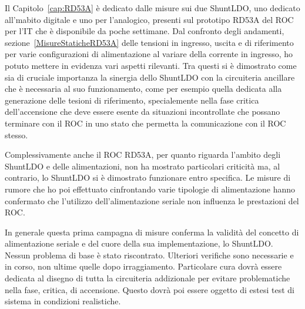 Il Capitolo~\ref{cap:RD53A} \`e dedicato dalle misure sui due ShuntLDO, uno dedicato all'mabito digitale e uno per l'analogico, presenti sul prototipo RD53A del ROC per l'IT che \`e disponibile da poche settimane.
Dal confronto degli andamenti, sezione~\ref{MisureStaticheRD53A} delle tensioni in ingresso, uscita e di riferimento per varie configurazioni di alimentazione 
al variare della corrente in ingresso, ho potuto mettere in evidenza vari aspetti rilevanti. Tra questi si \`e dimostrato come sia di cruciale importanza la sinergia dello ShuntLDO con la circuiteria ancillare che \`e necessaria al suo funzionamento, come per esempio quella dedicata alla generazione delle tesioni di riferimento, specialemente nella fase critica dell'accensione che deve essere esente da situazioni incontrollate che possano terminare con il ROC in uno stato che permetta la comunicazione con il ROC stesso.

Complessivamente anche il ROC RD53A, per quanto riguarda l'ambito degli ShuntLDO e delle alimentazioni, non ha mostrato particolari criticit\`a ma, al contrario, lo ShuntLDO si \`e dimostrato funzionare entro specifica. Le misure di rumore che ho poi effettuato cinfrontando varie tipologie di alimentazione hanno confermato che l'utilizzo dell'alimentazione seriale non influenza le prestazioni del ROC.

In generale questa prima campagna di misure conferma la validit\`a del concetto di alimentazione seriale e del cuore della sua implementazione, lo ShuntLDO. Nessun problema di base \`e stato riscontrato. Ulteriori verifiche sono necessarie e in corso, non ultime quelle dopo irraggiamento. Particolare cura dovr\`a essere dedicata al disegno di tutta la circuiteria addizionale per evitare problematiche nella fase, critica, di accensione. Questo dovr\`a poi essere oggetto di estesi test di sistema in condizioni realistiche.




